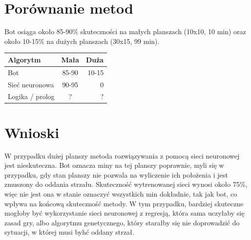 \documentclass[letterpaper,12pt]{article}
\begin{document}
\section{Porównanie metod}
Bot osiąga około 85-90\% skuteczności na małych planszach (10x10, 10 min) 
oraz około 10-15\% na dużych planszach (30x15, 99 min).
\begin{center} 
    \begin{tabular}  { | l | c | r |   }
        \hline
        Algorytm & Mała & Duża  \\
        \hline
        Bot & 85-90 & 10-15 \\
        \hline
        Sieć neuronowa & 90-95 & 0 \\
        \hline
        Logika / prolog & ? & ? \\
        \hline
    \end{tabular}
\end{center}
\section{Wnioski}
W przypadku dużej planszy metoda rozwiązywania z pomocą sieci neuronowej jest nieskuteczna. Bot oznacza miny na tej planszy poprawnie, 
myli się w przypadku, gdy stan planszy nie pozwala na wyliczenie ich położenia i jest zmuszony do oddania strzału. Skuteczność wytrenowanej sieci
wynosi około 75\%, więc nie jest ona w stanie oznaczyć wszystkich min dokładnie, tak jak bot, co wpływa na końcową skuteczność metody.
W tym przypadku, bardziej skuteczne mogłoby być wykorzystanie sieci neuronowej z regresją, która sama uczyłaby się zasad gry, albo algorytmu 
genetycznego, który starałby się nie doprowadzić do sytuacji, w której musi byhć oddany strzał.
\end{document}
